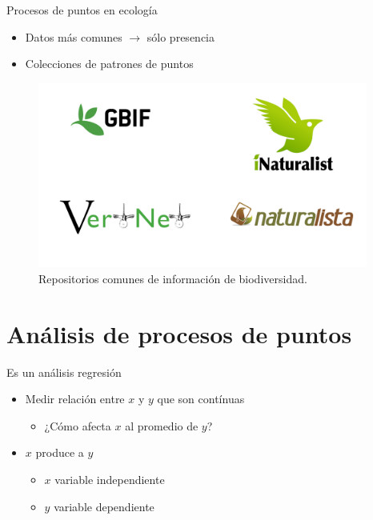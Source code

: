 \documentclass[
  11pt,
  ignorenonframetext,
]{beamer}
\providecommand{\tightlist}{%
  \setlength{\itemsep}{0pt}\setlength{\parskip}{0pt}}
\begin{document}
\begin{frame}{Procesos de puntos en ecología}
\protect\hypertarget{procesos-de-puntos-en-ecologuxeda}{}
\begin{itemize}
\item
  Datos más comunes \(\rightarrow\) sólo presencia
\item
  Colecciones de patrones de puntos
\end{itemize}

\begin{figure}
\includegraphics[width=4.27in]{Figuras/Repositorios} \caption{Repositorios comunes de información de biodiversidad.}\label{fig:colecciones}
\end{figure}
\end{frame}

\hypertarget{anuxe1lisis-de-procesos-de-puntos}{%
\section{Análisis de procesos de
puntos}\label{anuxe1lisis-de-procesos-de-puntos}}

\begin{frame}{Es un análisis regresión}
\protect\hypertarget{es-un-anuxe1lisis-regresiuxf3n}{}
\begin{itemize}
\item
  Medir relación entre \(x\) y \(y\) que son contínuas

  \begin{itemize}
  \tightlist
  \item
    ¿Cómo afecta \(x\) al promedio de \(y\)?
  \end{itemize}
\item
  \(x\) produce a \(y\)

  \begin{itemize}
  \tightlist
  \item
    \(x\) variable independiente
  \item
    \(y\) variable dependiente
  \end{itemize}
\end{itemize}
\end{frame}
\end{document}
